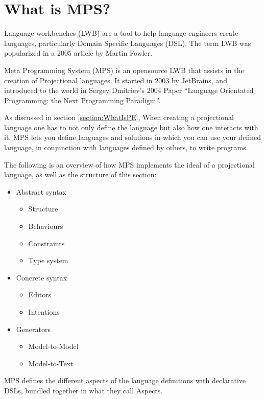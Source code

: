 \section{What is MPS?}

Language workbenches (LWB) are a tool to help language engineers create languages, particularly Domain Specific Languages (DSL).
The term LWB was popularized in a 2005 article by Martin Fowler\cite{Fowler_lwb}.

Meta Programming System (MPS) is an opensource LWB that assists in the creation of Projectional languages.
It started in 2003 by JetBrains, and introduced to the world in Sergey Dmitriev's 2004 Paper ``Language Orientated Programming: the Next Programming Paradigm''\cite{dmitriev2004language}.

As discussed in section \ref{section:WhatIsPE}, When creating a projectional language one has to not only define the language but also how one interacts with it.
MPS lets you define languages and solutions in which you can use your defined language, in conjunction with languages defined by others, to write programs.

The following is an overview of how MPS implements the ideal of a projectional language, as well as the structure of this section: 

\begin{itemize}
    \item Abstract syntax
    \begin{itemize}
        \item Structure
        \item Behaviours
        \item Constraints
        \item Type system
    \end{itemize}
    \item Concrete syntax
    \begin{itemize}
        \item Editors
        \item Intentions
    \end{itemize}
    \item Generators
    \begin{itemize}
        \item Model-to-Model
        \item Model-to-Text
    \end{itemize}
\end{itemize}

MPS defines the different aspects of the language definitions with declarative DSLs, bundled together in what they call Aspects.

